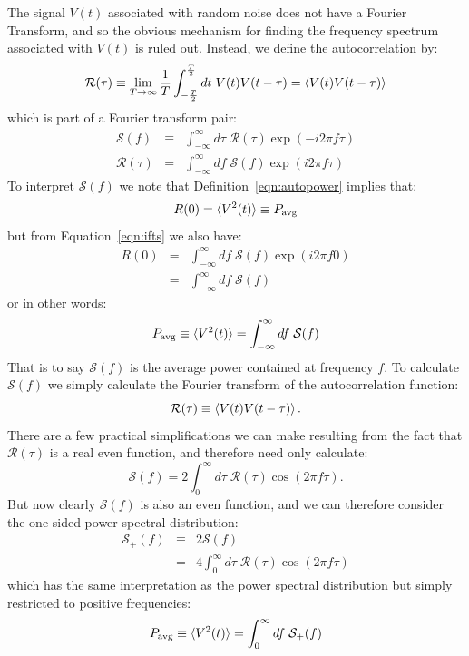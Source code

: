 \documentclass[12pt]{article}
\begin{document}
The signal $V(t)$ associated with random noise does not have a Fourier Transform, and so the obvious mechanism for finding the frequency spectrum associated with $V(t)$ is ruled out.  Instead, we define the autocorrelation by:
\begin{equation}
\mathcal{R}(\tau) \equiv \lim_{T \to \infty } \frac{1}{T} \int_{-\frac{T}{2}}^{\frac{T}{2}} dt \; V(t) V(t-\tau) = \braket{V(t) V(t-\tau)}
\label{eqn:autopower}
\end{equation}
which is part of a Fourier transform pair:
\begin{eqnarray}
\mathcal{S}(f) &\equiv& \int_{-\infty}^{\infty} d\tau \; \mathcal{R}(\tau) \exp(-i2\pi f \tau) \\ 
\mathcal{R}(\tau) &=& \int_{-\infty}^{\infty} df \; \mathcal{S}(f) \exp(i2\pi f \tau)  \label{eqn:ifts}
\end{eqnarray}
To interpret $\mathcal{S}(f)$ we note that Definition~\ref{eqn:autopower} implies that:
\begin{displaymath}
R(0) = \braket{V^2(t)} \equiv P_{\rm avg}
\end{displaymath}
but from Equation~\ref{eqn:ifts} we also have:
\begin{eqnarray*}
R(0) &=& \int_{-\infty}^{\infty} df \; \mathcal{S}(f) \exp(i2\pi f 0) \\
        &=& \int_{-\infty}^{\infty} df \; \mathcal{S}(f)
\end{eqnarray*}
or in other words:
\begin{displaymath}
P_{\rm avg} \equiv \braket{V^2(t)} = \int_{-\infty}^{\infty} df \; \mathcal{S}(f) 
\end{displaymath}
That is to say $\mathcal{S}(f)$ is the average power contained at frequency $f$.  To calculate $\mathcal{S}(f)$ we simply calculate the Fourier transform of the autocorrelation function:
\begin{equation}
\mathcal{R}(\tau) \equiv \braket{V(t) V(t-\tau)}.
\end{equation}
There are a few practical simplifications we can make resulting from the fact that $\mathcal{R}(\tau)$
is a real even function, and therefore need only calculate:
\begin{displaymath}
\mathcal{S}(f) =2  \int^{\infty}_{0} d\tau \; \mathcal{R}(\tau) \cos(2\pi f \tau).
\end{displaymath}
But now clearly $\mathcal{S}(f)$ is also an even function, and we can therefore consider the one-sided-power spectral distribution:
\begin{eqnarray}
\mathcal{S}_{+}(f) &\equiv& 2 \mathcal{S}(f) \\ 
&=& 4  \int^{\infty}_{0} d\tau \; \mathcal{R}(\tau) \cos(2\pi f \tau) 
\end{eqnarray}
which has the same interpretation as the power spectral distribution but simply restricted to positive frequencies:
\begin{equation}
P_{\rm avg} \equiv \braket{V^2(t)} = \int_{0}^{\infty} df \; \mathcal{S}_+(f) 
\end{equation}
\end{document}
